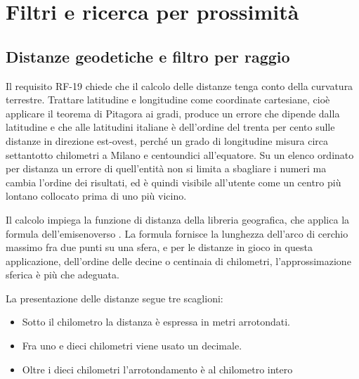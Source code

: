 
\section{Filtri e ricerca per prossimità}\label{sec:impl-filtri}

\subsection{Distanze geodetiche e filtro per raggio}\label{subsec:impl-filtraggio}

Il requisito RF-19 chiede che il calcolo delle distanze tenga conto della curvatura terrestre. %
Trattare latitudine e longitudine come coordinate cartesiane, cioè applicare il teorema di Pitagora ai gradi, produce un errore che
dipende dalla latitudine e che alle latitudini italiane è dell'ordine del trenta per cento sulle distanze in direzione est-ovest,
perché un grado di longitudine misura circa settantotto chilometri a Milano e centoundici all'equatore.
Su un elenco ordinato per distanza un errore di quell'entità non si limita a sbagliare i numeri ma cambia l'ordine dei risultati,
ed è quindi visibile all'utente come un centro più lontano collocato prima di uno più vicino.

Il calcolo impiega la funzione di distanza della libreria geografica, che applica la formula dell'emisenoverso \cite{sinnottHaversine}.
La formula fornisce la lunghezza dell'arco di cerchio massimo fra due punti su una sfera, e per le distanze in gioco in questa applicazione,
dell'ordine delle decine o centinaia di chilometri, l'approssimazione sferica è più che adeguata.%

La presentazione delle distanze segue tre scaglioni:%

\begin{itemize}
  \item Sotto il chilometro la distanza è espressa in metri arrotondati.
  \item Fra uno e dieci chilometri viene usato un decimale.
  \item Oltre i dieci chilometri l'arrotondamento è al chilometro intero%
\end{itemize}

